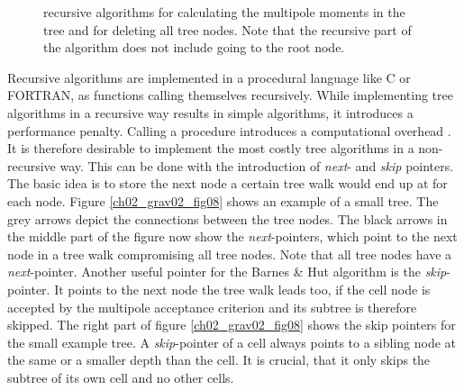 \begin{figure}[htbp]
\begin{center}
\caption{recursive algorithms for calculating the multipole moments in the tree and for deleting all tree nodes. Note that the recursive part of the algorithm does not include going to the root node.}
\label{ch02_grav02_fig07}
\end{center}
\end{figure}

Recursive algorithms are implemented in a procedural language like C or FORTRAN, as functions calling themselves recursively. While implementing tree algorithms in a recursive way results in simple algorithms, it introduces a performance penalty. Calling a procedure introduces a computational overhead \citep{bryant2010computer}. It is therefore desirable to implement the most costly tree algorithms in a non-recursive way. This can be done with the introduction of \emph{next}- and \emph{skip} pointers. The basic idea is to store the next node a certain tree walk would end up at for each node. Figure \ref{ch02_grav02_fig08} shows an example of a small tree. The grey arrows depict the connections between the tree nodes. The black arrows in the middle part of the figure now show the \emph{next}-pointers, which point to the next node in a tree walk compromising all tree nodes. Note that all tree nodes have a \emph{next}-pointer. Another useful pointer for the Barnes \& Hut algorithm is the \emph{skip}-pointer. It points to the next node the tree walk leads too, if the cell node is accepted by the multipole acceptance criterion and its subtree is therefore skipped. The right part of figure \ref{ch02_grav02_fig08} shows the skip pointers for the small example tree. A \emph{skip}-pointer of a cell always points to a sibling node at the same or a smaller depth than the cell. It is crucial, that it only skips the subtree of its own cell and no other cells. 

